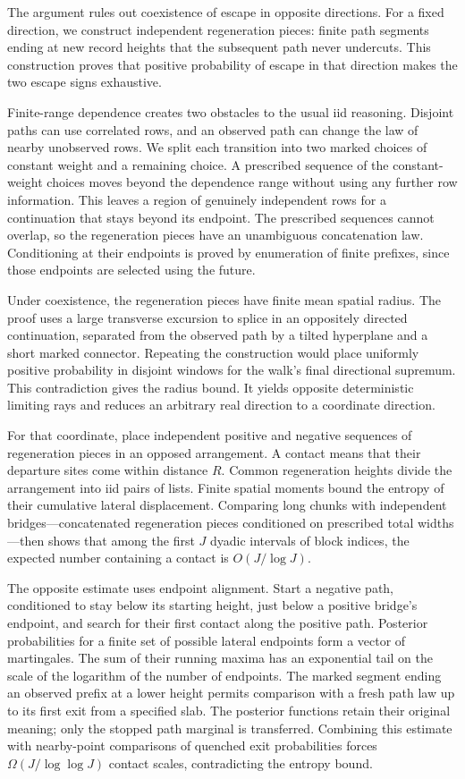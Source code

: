 \documentclass[11pt]{article}
\numberwithin{equation}{section}
\theoremstyle{definition}
\theoremstyle{remark}
\begin{document}
The argument rules out coexistence of escape in opposite directions.
For a fixed direction, we construct independent regeneration pieces:
finite path segments ending at new record heights that the subsequent
path never undercuts. This construction proves that positive probability
of escape in that direction makes the two escape signs exhaustive.

Finite-range dependence creates two obstacles to the usual iid reasoning.
Disjoint paths can use correlated rows, and an observed path can change the
law of nearby unobserved rows. We split each transition into two marked
choices of constant weight and a remaining choice. A prescribed sequence
of the constant-weight choices moves beyond the dependence range without
using any further row information. This leaves a region of genuinely
independent rows for a continuation that stays beyond its endpoint.
The prescribed sequences cannot overlap, so the regeneration pieces have
an unambiguous concatenation law. Conditioning at their endpoints is
proved by enumeration of finite prefixes, since those endpoints are
selected using the future.

Under coexistence, the regeneration pieces have finite mean spatial
radius. The proof uses a large transverse excursion to splice in an
oppositely directed continuation, separated from the observed path by a
tilted hyperplane and a short marked connector. Repeating the construction
would place uniformly positive probability in disjoint windows for the
walk's final directional supremum. This contradiction gives the radius
bound. It yields opposite deterministic limiting rays and reduces an
arbitrary real direction to a coordinate direction.

For that coordinate, place independent positive and negative sequences
of regeneration pieces in an opposed arrangement. A contact means that
their departure sites come within distance $R$. Common regeneration
heights divide the arrangement into iid pairs of lists. Finite spatial
moments bound the entropy of their cumulative lateral displacement.
Comparing long chunks with independent bridges---concatenated regeneration
pieces conditioned on prescribed total widths---then shows that among
the first $J$ dyadic intervals of block indices, the expected number
containing a contact is $O(J/\log J)$.

The opposite estimate uses endpoint alignment. Start a negative path,
conditioned to stay below its starting height, just below a positive
bridge's endpoint, and search for their first contact along the positive
path. Posterior probabilities for a finite set of possible lateral
endpoints form a vector of martingales. The sum of their running
maxima has an exponential tail on the scale of the logarithm of the number
of endpoints. The marked segment ending an observed prefix at a lower
height permits comparison with a fresh path law up to its first exit
from a specified slab. The posterior
functions retain their original meaning; only the stopped path marginal
is transferred. Combining this estimate with nearby-point comparisons of
quenched exit probabilities forces $\Omega(J/\log\log J)$ contact scales,
contradicting the entropy bound.
\end{document}
